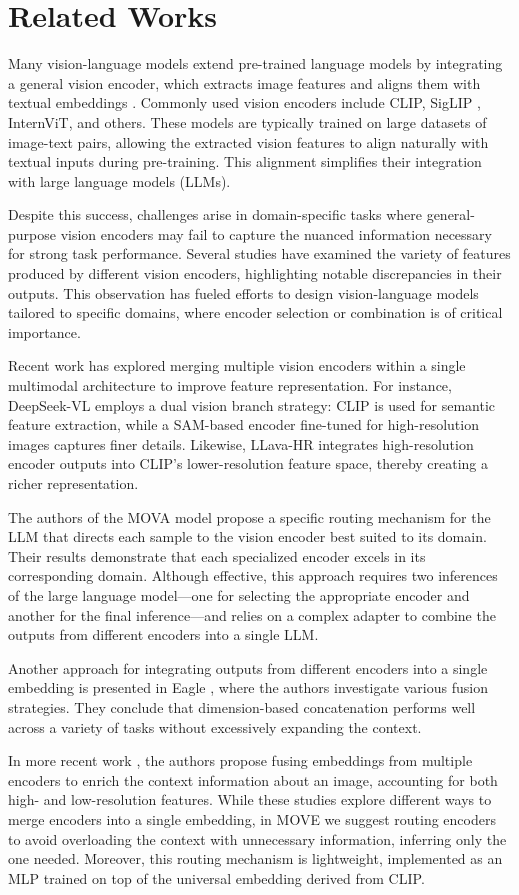 \section{Related Works}
Many vision-language models extend pre-trained language models by integrating a general vision encoder, which extracts image features and aligns them with textual embeddings \cite{chen2024internvl, li2024llava}. Commonly used vision encoders include CLIP, SigLIP \cite{siglip}, InternViT, and others. These models are typically trained on large datasets of image-text pairs, allowing the extracted vision features to align naturally with textual inputs during pre-training. This alignment simplifies their integration with large language models (LLMs).

Despite this success, challenges arise in domain-specific tasks where general-purpose vision encoders may fail to capture the nuanced information necessary for strong task performance. Several studies have examined the variety of features produced by different vision encoders, highlighting notable discrepancies in their outputs. This observation has fueled efforts to design vision-language models tailored to specific domains, where encoder selection or combination is of critical importance.

Recent work has explored merging multiple vision encoders within a single multimodal architecture to improve feature representation. For instance, DeepSeek-VL employs a dual vision branch strategy: CLIP is used for semantic feature extraction, while a SAM-based encoder fine-tuned for high-resolution images captures finer details. Likewise, LLava-HR integrates high-resolution encoder outputs into CLIP’s lower-resolution feature space, thereby creating a richer representation.

The authors of the MOVA model \cite{zong2024movaadaptingmixturevision} propose a specific routing mechanism for the LLM that directs each sample to the vision encoder best suited to its domain. Their results demonstrate that each specialized encoder excels in its corresponding domain. Although effective, this approach requires two inferences of the large language model—one for selecting the appropriate encoder and another for the final inference—and relies on a complex adapter to combine the outputs from different encoders into a single LLM.

Another approach for integrating outputs from different encoders into a single embedding is presented in Eagle \cite{shi2024eagleexploringdesignspace}, where the authors investigate various fusion strategies. They conclude that dimension-based concatenation performs well across a variety of tasks without excessively expanding the context.

In more recent work \cite{azadani2025leo}, the authors propose fusing embeddings from multiple encoders to enrich the context information about an image, accounting for both high- and low-resolution features. While these studies explore different ways to merge encoders into a single embedding, in MOVE we suggest routing encoders to avoid overloading the context with unnecessary information, inferring only the one needed. Moreover, this routing mechanism is lightweight, implemented as an MLP trained on top of the universal embedding derived from CLIP.